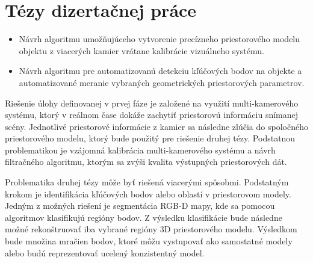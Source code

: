 \chapter{Tézy dizertačnej práce}
\label{kap:tezy}
\pagestyle{fancy}
\fancyhf{}
\fancyfoot[CE,CO]{\thepage}
\renewcommand{\footrulewidth}{1pt}



\begin{itemize}
	\item Návrh algoritmu umožňujúceho vytvorenie precízneho priestorového modelu objektu z viacerých kamier vrátane kalibrácie vizuálneho systému.
	\item Návrh algoritmu pre automatizovanú detekciu kľúčových bodov na objekte a automatizované meranie vybraných geometrických priestorových parametrov.
\end{itemize}



Riešenie úlohy definovanej v prvej fáze je založené na využití multi-kamerového systému, ktorý v reálnom čase dokáže zachytiť priestorovú informáciu snímanej scény. Jednotlivé priestorové informácie z kamier sa následne zlúčia do spoločného priestorového modelu, ktorý bude použitý pre riešenie druhej tézy.
Podstatnou problematikou je vzájomná kalibrácia multi-kamerového systému a návrh filtračného algoritmu, ktorým sa zvýši kvalita výstupných priestorových dát. 

Problematika druhej tézy môže byť riešená viacerými spôsobmi. Podstatným krokom je identifikácia kľúčových bodov alebo oblastí v priestorovom modely. Jedným z možných riešení je segmentácia RGB-D mapy, kde sa pomocou algoritmov klasifikujú regióny bodov. Z výsledku klasifikácie bude následne možné rekonštruovať iba vybrané regióny 3D priestorového modelu. Výsledkom bude množina mračien bodov, ktoré môžu vystupovať ako samostatné modely alebo budú reprezentovať ucelený konzistentný model.



